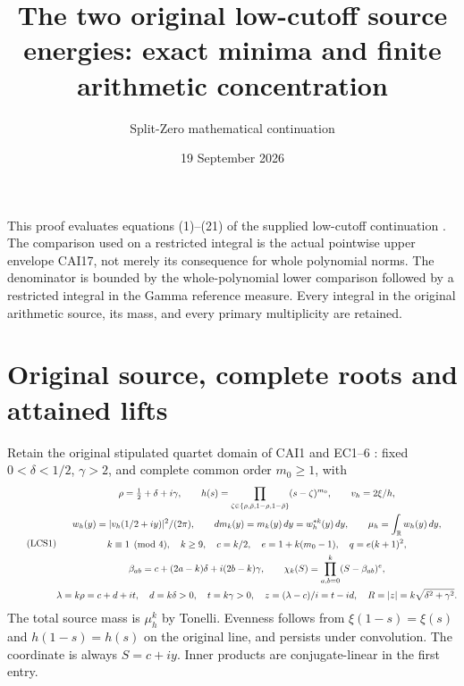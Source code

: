 \documentclass[11pt]{article}
\title{The two original low-cutoff source energies: exact minima and finite arithmetic concentration}
\author{Split-Zero mathematical continuation}
\date{19 September 2026}
\begin{document}
\maketitle

This proof evaluates equations (1)--(21) of the supplied low-cutoff
continuation \cite{lce}. The comparison used on a restricted integral is
the actual pointwise upper envelope CAI17, not merely its consequence
for whole polynomial norms. The denominator is bounded by the
whole-polynomial lower comparison followed by a restricted integral in
the Gamma reference measure. Every integral in the original arithmetic
source, its mass, and every primary multiplicity are retained.

\section{Original source, complete roots and attained lifts}

Retain the original stipulated quartet domain of CAI1 and EC1--6
\cite{cai,ec}: fixed $0<\delta<1/2$, $\gamma>2$, and complete common
order $m_0\ge1$, with
\begin{equation}\tag{LCS1}
\begin{gathered}
 \rho=\tfrac12+\delta+i\gamma,\qquad
 h(s)=\prod_{\zeta\in\{\rho,\bar\rho,1-\rho,1-\bar\rho\}}
                      (s-\zeta)^{m_0},\qquad v_h=2\xi/h,\\
 w_h(y)=|v_h(1/2+iy)|^2/(2\pi),\qquad
 dm_k(y)=m_k(y)\,dy=w_h^{*k}(y)\,dy,\qquad
 \mu_h=\int_\mathbb R w_h(y)\,dy,\\
 k\equiv1\pmod4,\quad k\ge9,\quad c=k/2,\quad
 e=1+k(m_0-1),\quad q=e(k+1)^2,\\
 \beta_{ab}=c+(2a-k)\delta+i(2b-k)\gamma,\qquad
 \chi_k(S)=\prod_{a,b=0}^k(S-\beta_{ab})^e,\\
 \lambda=k\rho=c+d+it,\quad d=k\delta>0,\quad t=k\gamma>0,\quad
 z=(\lambda-c)/i=t-id,\quad R=|z|=k\sqrt{\delta^2+\gamma^2}.
\end{gathered}
\end{equation}
The total source mass is $\mu_h^k$ by Tonelli. Evenness follows from
$\xi(1-s)=\xi(s)$ and $h(1-s)=h(s)$ on the original line, and persists
under convolution. The coordinate is always $S=c+iy$. Inner products
are conjugate-linear in the first entry.
\end{document}
